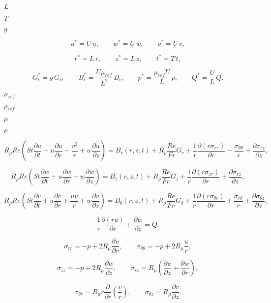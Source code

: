 \documentclass{article}
\begin{document}
$ L $
\pagebreak

$ T $
\pagebreak

$ g $
\pagebreak

\[ u^* = U\, u, \qquad w^* = U\, w, \qquad v^* = U\, v, \]
\pagebreak

\[ r^* = L\, r, \qquad z^* = L\, z, \qquad t^* = T\, t, \]
\pagebreak

\[ G_i^* = g\, G_i, \qquad B_i^* = \frac{U\mu_{ref}}{L^2}\, B_i, \qquad p^* = \frac{\mu_{ref} U}{L}\, p, \qquad Q^* = \frac{U}{L}\, Q. \]
\pagebreak

$ \mu_{ref} $
\pagebreak

$ \rho_{ref} $
\pagebreak

$ \mu $
\pagebreak

$ \rho $
\pagebreak

\[ R_{\rho} Re\left(St\frac{\partial u}{\partial t} + {u}\frac{\partial u}{\partial r} - \frac{{v}^2}{r} + {w}\frac{\partial u}{\partial z} \right) = B_r\left(r,z,t\right)+ R_\rho \frac{Re}{Fr} G_r + \frac{1}{r} \frac{\partial\left({r}\sigma_{rr}\right)}{\partial r} - \frac{\sigma_{\theta\theta}}{r} + \frac{\partial\sigma_{rz}}{\partial z}, \]
\pagebreak

\[ R_{\rho} Re\left(St\frac{\partial w}{\partial t} + {u}\frac{\partial w}{\partial r} + {w}\frac{\partial w}{\partial z} \right) = B_z\left(r,z,t\right)+ R_\rho \frac{Re}{Fr} G_z+ \frac{1}{r}\frac{\partial\left({r}\sigma_{zr}\right)}{\partial r} + \frac{\partial\sigma_{zz}}{\partial z}, \]
\pagebreak

\[ R_{\rho} Re\left(St\frac{\partial v}{\partial t} + {u}\frac{\partial v}{\partial r} + \frac{u v}{r} +{w}\frac{\partial v}{\partial z} \right)= B_\theta\left(r,z,t\right)+ R_\rho \frac{Re}{Fr} G_\theta+ \frac{1}{r}\frac{\partial\left({r}\sigma_{\theta r}\right)}{\partial r} + \frac{\sigma_{r\theta}}{r} + \frac{\partial\sigma_{\theta z}}{\partial z}, \]
\pagebreak

\[ \frac{1}{r}\frac{\partial\left(ru\right)}{\partial r} + \frac{\partial w}{\partial z} = Q. \]
\pagebreak

\[ \sigma_{rr} = -p + 2R_\mu \frac{\partial u}{\partial r}, \qquad \sigma_{\theta\theta} = -p +2R_\mu \frac{u}{r}, \]
\pagebreak

\[ \sigma_{zz} = -p + 2R_\mu \frac{\partial w}{\partial z}, \qquad \sigma_{rz} = R_\mu \left(\frac{\partial u}{\partial z} + \frac{\partial w}{\partial r}\right), \]
\pagebreak

\[ \sigma_{\theta r} = R_\mu r \frac{\partial}{\partial r}\left(\frac{v}{r}\right), \qquad \sigma_{\theta z} = R_\mu \frac{\partial v}{\partial z}. \]
\pagebreak
\end{document}
